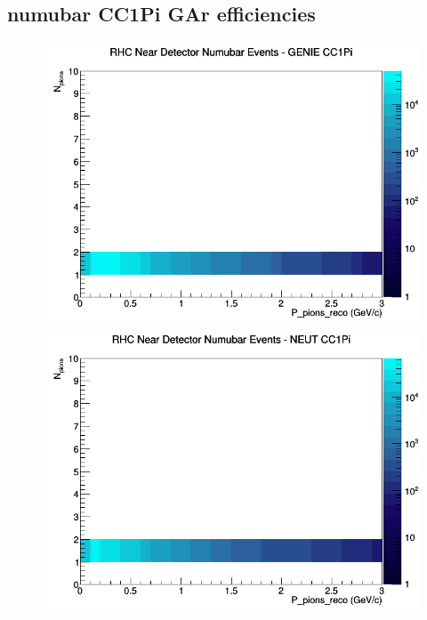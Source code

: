 \documentclass[12pt]{article}
\begin{document}
\subsection{numubar CC1Pi GAr efficiencies}
\begin{figure}[h]
\includegraphics[width=\linewidth]{eff_N_P/GAr/pions/CC1Pi_RHC_ND_numubar_N_P_GENIE.png}
\endminipage
{}
\includegraphics[width=\linewidth]{eff_N_P/GAr/pions/CC1Pi_RHC_ND_numubar_N_P_NEUT.png}
\endminipage
{}

\end{figure}
\end{document}
